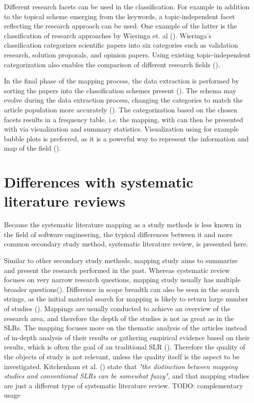 \documentclass[utf8,english]{gradu3}
\begin{document}
Different research facets can be used in the classification. For example in
addition to the topical scheme emerging from the keywords, a topic-independent
facet reflecting the research approach can be used. One example of the latter is
the classification of research approaches by Wieringa et. al
(\cite*{wieringa2006}). Wieringa's classification categorizes scientific papers
into six categories such as validation research, solution proposals, and opinion
papers. Using existing topic-independent categorization also enables the
comparison of  different research fields (\cite{petersen2015}).

In the final phase of the mapping process, the data extraction is performed by
sorting the papers into the classification schemes present
(\cite{petersen2008}). The schema may evolve during the data extraction process,
changing the categories to match the article population more accurately
(\cite{petersen2015}). The categorization based on the chosen facets results in
a frequency table, i.e. the mapping, with can then be presented with via
visualization and summary statistics. Visualization using for example bubble
plots is preferred, as it is a powerful way to represent the information and map
of the field (\cite{petersen2008}).


\section{Differences with systematic literature reviews}

Because the systematic literature mapping as a study methods is less known in
the field of software engineering, the typical differences between it and more
common secondary study method, systematic literature review, is presented here.

Similar to other secondary study methods, mapping study aims to summarize and
present the research performed in the past. Whereas systematic review focuses on
very narrow research questions, mapping study usually has multiple broader
questions(\cite{kitchenham2010}). Difference in scope breadth can also be seen
in the search strings, as the initial material search for mapping is likely to
return large number of studies (\cite{kitchenham2007, petersen2008}). Mappings
are usually conducted to achieve an overview of the research area, and therefore
the depth of the studies is not as great as in the SLRs. The mapping focuses
more on the thematic analysis of the articles instead of in-depth analysis of
their results or gathering empirical evidence based on their results, which is
often the goal of an traditional SLR (\cite{petersen2008}). Therefore the
quality of the objects of study is not relevant, unless the quality itself is
the aspect to be investigated.
Kitchenham et al. (\cite{kitchenham2010}) state that \textit{"the distinction between mapping studies and conventional SLRs can be somewhat fuzzy"}, and that mapping studies are just a different type of systematic literature review. TODO: complementary usage
\end{document}
